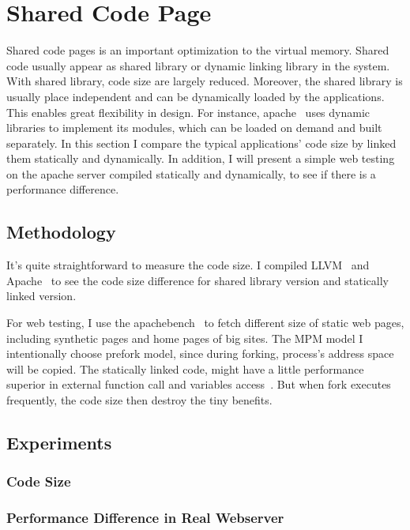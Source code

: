 \section{Shared Code Page}
	\label{sec:sharedobj}
Shared code pages is an important optimization to the virtual memory. Shared code
usually appear as shared library or dynamic linking library in the system.
With shared library, code size are largely reduced.  Moreover, the shared
library is usually place independent and can be dynamically loaded by the
applications.  This enables great flexibility in design. For instance,
apache~\cite{apache} uses dynamic libraries to implement its modules, which can
be loaded on demand and built separately. In this section I compare the typical
applications' code size by linked them statically and dynamically. In addition,
I will present a simple web testing on the apache server compiled statically
and dynamically, to see if there is a performance difference.

\subsection{Methodology}
It's quite straightforward to measure the code size. I compiled
LLVM~\cite{llvm} and Apache~\cite{apache} to see the code size difference for
shared library version and statically linked version.

For web testing, I use the apachebench~\cite{apachebench} to fetch different
size of static web pages, including synthetic pages and home pages of big
sites. The MPM model I intentionally choose prefork model, since during
forking, process's address space will be copied. The statically linked code,
might have a little performance superior in external function call and
variables access~\cite{linker}. But when fork executes frequently, the code
size then destroy the tiny benefits.

\subsection{Experiments}
\subsubsection{Code Size}

\subsubsection{Performance Difference in Real Webserver}



